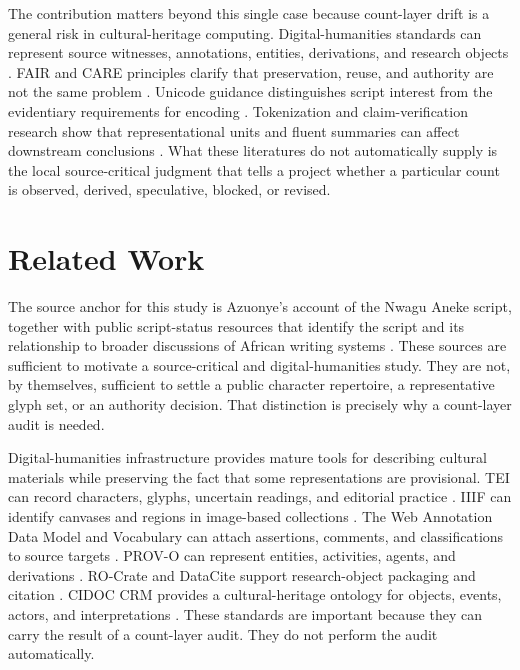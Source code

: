 \documentclass[sigconf,nonacm]{acmart}
\begin{document}
The contribution matters beyond this single case because count-layer drift is a
general risk in cultural-heritage computing. Digital-humanities standards can
represent source witnesses, annotations, entities, derivations, and research
objects \cite{teiP5Glyphs,iiifPresentation3,w3cAnnotationModel,w3cAnnotationVocab,w3cProvO,rocrate12,cidocCrm,datacite45}.
FAIR and CARE principles clarify that preservation, reuse, and authority are
not the same problem \cite{wilkinson2016fair,carroll2020care}. Unicode guidance
distinguishes script interest from the evidentiary requirements for encoding
\cite{unicodeAfricanScripts2023,unicode17CoreSpec,unicodeProposals,unicodeRoadmaps,unicodePipeline2026,seiProposalTips}.
Tokenization and claim-verification research show that representational units
and fluent summaries can affect downstream conclusions
\cite{sennrich2016bpe,kudo2018sentencepiece,bostrom2020bytepair,rust2021tokenization,wadden2020scifact,gao2023alce}.
What these literatures do not automatically supply is the local source-critical
judgment that tells a project whether a particular count is observed, derived,
speculative, blocked, or revised.

\section{Related Work}
The source anchor for this study is Azuonye's account of the Nwagu Aneke script,
together with public script-status resources that identify the script and its
relationship to broader discussions of African writing systems
\cite{azuonye1992,omniglotNwagu,scriptSourceNwagu,sirisNwaguProposal}. These
sources are sufficient to motivate a source-critical and digital-humanities
study. They are not, by themselves, sufficient to settle a public character
repertoire, a representative glyph set, or an authority decision. That
distinction is precisely why a count-layer audit is needed.

Digital-humanities infrastructure provides mature tools for describing cultural
materials while preserving the fact that some representations are provisional.
TEI can record
characters, glyphs, uncertain readings, and editorial practice
\cite{teiP5Glyphs}. IIIF can identify canvases and regions in image-based
collections \cite{iiifPresentation3}. The Web Annotation Data Model and
Vocabulary can attach assertions, comments, and classifications to source
targets \cite{w3cAnnotationModel,w3cAnnotationVocab}. PROV-O can represent
entities, activities, agents, and derivations \cite{w3cProvO}. RO-Crate and
DataCite support research-object packaging and citation
\cite{rocrate12,datacite45}. CIDOC CRM provides a cultural-heritage ontology for
objects, events, actors, and interpretations \cite{cidocCrm}. These standards
are important because they can carry the result of a count-layer audit. They do
not perform the audit automatically.
\end{document}
